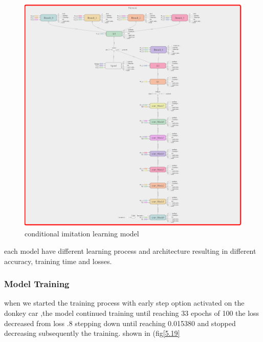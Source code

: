  \begin{figure}%
  \includegraphics[width=1\textwidth]{images/Learningprocess/carla.png}%
     \caption[conditional imitation learning model]{ conditional imitation learning model}\label{fig:  conditional imitation learning model}%
  \end{figure}
each model have different learning process and architecture resulting in different accuracy, training time and losses.
\subsubsection{Model Training}
\hspace{2cm}when  we started the training process with early step option activated on the donkey car ,the model continued training until reaching 33 epochs of 100  the loss decreased  from loss .8 stepping down until reaching 0.015380 and stopped decreasing subsequently the training.
shown in (fig\ref{5.19}

